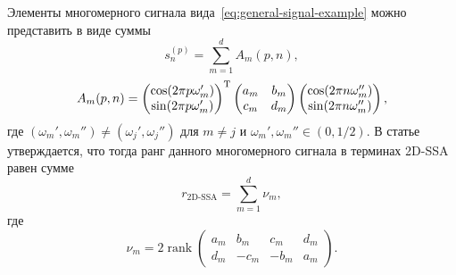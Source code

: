 \documentclass[specialist,
  substylefile=spbu.rtx,
subf,href,colorlinks=true, 12pt]{disser}
\theoremstyle{plain}
\theoremstyle{definition}
\theoremstyle{remark}
\begin{document}
Элементы многомерного сигнала вида~\eqref{eq:general-signal-example} можно
представить в виде суммы
\[
  s^{(p)}_n = \sum_{m=1}^{d} A_m(p, n),
\]
\[
  A_m(p, n) =
  \begin{pmatrix}
    \cos(2\pi p\omega_m') \\
    \sin(2\pi p\omega_m')
  \end{pmatrix}^{\mathrm{T}}
  \begin{pmatrix}
    a_m & b_m \\
    c_m & d_m
  \end{pmatrix}
  \begin{pmatrix}
    \cos(2\pi n\omega_m'') \\
    \sin(2\pi n\omega_m'')
  \end{pmatrix},
\]
где $(\omega_m', \omega_m'') \ne (\omega_j', \omega_j'')$ для $m\ne j$ и $\omega_m', \omega_m'' \in (0, 1/2)$.
В статье~\cite{2d-ssa} утверждается, что тогда ранг данного многомерного сигнала в терминах
2D-SSA равен сумме
\[
  r_\text{2D-SSA} = \sum_{m=1}^{d} \nu_m,
\]
где
\[
  \nu_m = 2\operatorname{rank}
  \begin{pmatrix}
    a_m & b_m  & c_m  & d_m \\
    d_m & -c_m & -b_m & a_m
  \end{pmatrix}.
\]
\end{document}
